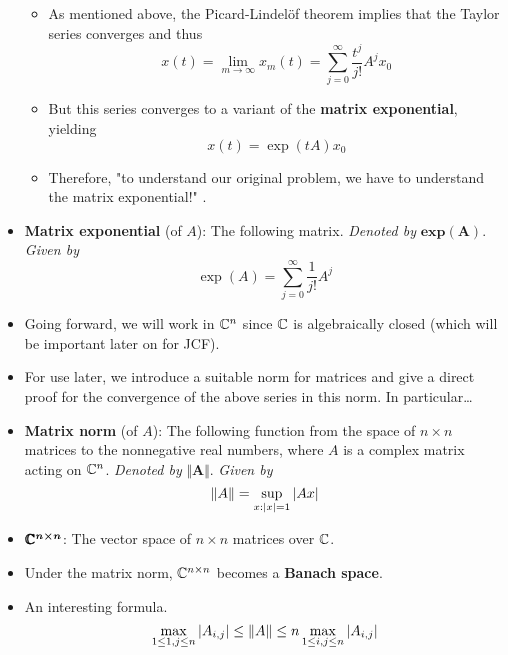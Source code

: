 \documentclass[../notes.tex]{subfiles}
\begin{document}
\begin{itemize}
\begin{itemize}
        \item As mentioned above, the Picard-Lindel\"{o}f theorem implies that the Taylor series converges and thus
        \begin{equation*}
            x(t) = \lim_{m\to\infty}x_m(t)
            = \sum_{j=0}^\infty\frac{t^j}{j!}A^jx_0
        \end{equation*}
        \item But this series converges to a variant of the \textbf{matrix exponential}, yielding
        \begin{equation*}
            x(t) = \exp(tA)x_0
        \end{equation*}
        \item Therefore, "to understand our original problem, we have to understand the matrix exponential!" \parencite[60]{bib:Teschl}.
    \end{itemize}
    \item \textbf{Matrix exponential} (of $A$): The following matrix. \emph{Denoted by} $\bm{\textbf{exp}(A)}$. \emph{Given by}
    \begin{equation*}
        \exp(A) = \sum_{j=0}^\infty\frac{1}{j!}A^j
    \end{equation*}
    \item Going forward, we will work in $\mathbb{C}^n$ since $\mathbb{C}$ is algebraically closed (which will be important later on for JCF).
    \item For use later, we introduce a suitable norm for matrices and give a direct proof for the convergence of the above series in this norm. In particular\dots
    \item \textbf{Matrix norm} (of $A$): The following function from the space of $n\times n$ matrices to the nonnegative real numbers, where $A$ is a complex matrix acting on $\mathbb{C}^n$. \emph{Denoted by} $\bm{\Vert A\Vert}$. \emph{Given by}
    \begin{equation*}
        \norm{A} = \sup_{x:|x|=1}|Ax|
    \end{equation*}
    \item $\bm{\pmb{\mathbb{C}}^{n\times n}}$: The vector space of $n\times n$ matrices over $\mathbb{C}$.
    \item Under the matrix norm, $\mathbb{C}^{n\times n}$ becomes a \textbf{Banach space}.
    \item An interesting formula.
    \begin{equation*}
        \max_{1\leq 1,j\leq n}|A_{i,j}| \leq \norm{A}
        \leq n\max_{1\leq i,j\leq n}|A_{i,j}|
    \end{equation*}

\end{itemize}
\end{document}
